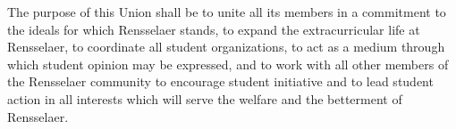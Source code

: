 The purpose of this Union shall be to unite all its members in a commitment to the ideals for which Rensselaer stands, to expand the extracurricular life at Rensselaer, to coordinate all student organizations, to act as a medium through which student opinion may be expressed, and to work with all other members of the Rensselaer community to encourage student initiative and to lead student action in all interests which will serve the welfare and the betterment of Rensselaer.